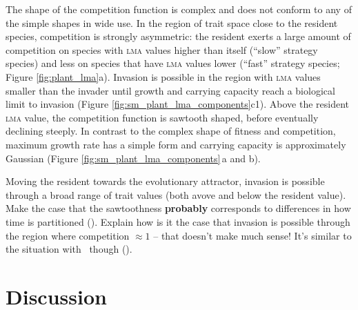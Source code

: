 \documentclass[a4paper,11pt]{article}
\begin{document}
The shape of the competition function is complex and does not conform
to any of the simple shapes in wide use.
In the region of trait space close to the resident species,
competition is strongly asymmetric: the resident exerts a large amount
of competition on species with \textsc{lma} values higher than itself (``slow''
strategy species) and less on species that have \textsc{lma} values lower
(``fast'' strategy species; Figure \ref{fig:plant_lma}a).  Invasion is
possible in the region with \textsc{lma} values smaller than the invader until
growth and carrying capacity reach a biological limit to invasion
(Figure \ref{fig:sm_plant_lma_components}c1).
%
Above the resident \textsc{lma} value, the competition function is sawtooth
shaped, before eventually declining steeply.
%
In contrast to the complex shape of fitness and competition, maximum
growth rate has a simple form and carrying capacity is approximately
Gaussian (Figure \ref{fig:sm_plant_lma_components}\,a and b).

Moving the resident towards the evolutionary attractor, invasion is
possible through a broad range of trait values (both avove and below
the resident value).
%
Make the case that the sawtoothness \textbf{probably} corresponds to
differences in how time is partitioned (\TODO).
%
Explain how is it the case that invasion is possible through the
region where competition $\approx 1$ -- that doesn't make much sense!
It's similar to the situation with \hmat\ though (\TODO).

\section{Discussion}
\end{document}
